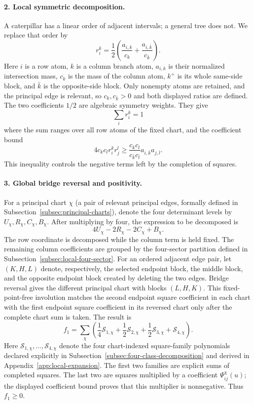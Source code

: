 \documentclass[11pt]{article}
\begin{document}
\paragraph{2. Local symmetric decomposition.}
A caterpillar has a linear order of adjacent intervals; a general tree does
not.  We replace that order by
\[
r_i^k=\frac12\left(\frac{a_{i,k}}{c_k}+\frac{a_{i,\bar k}}{c_{\bar k}}\right).
\]
Here $i$ is a row atom, $k$ is a column branch atom,
$a_{i,k}$ is their normalized intersection mass, $c_k$ is the mass of the
column atom, $k^+$ is its whole same-side block, and $\bar k$ is the
opposite-side block.  Only nonempty atoms are retained, and the principal
edge is relevant, so $c_k,c_{\bar k}>0$ and both displayed ratios are
defined.  The two coefficients $1/2$ are
algebraic symmetry weights.  They give
\[
\sum_i r_i^k=1
\]
where the sum ranges over all row atoms of the fixed chart,
and the coefficient bound
\[
4c_kc_l r_i^k r_j^l
\ge
\frac{c_kc_l}{c_{\bar k}c_{\bar l}}
a_{i,\bar k}a_{j,\bar l}.
\]
This inequality controls the negative terms left by the completion of squares.

\paragraph{3. Global bridge reversal and positivity.}
For a principal chart $\chi$ (a pair of relevant principal edges, formally
defined in Subsection~\ref{subsec:principal-charts}), denote the four
determinant levels by
$U_\chi,R_\chi,C_\chi,B_\chi$.  After multiplying by four, the expression to
be decomposed is
\[
4U_\chi-2R_\chi-2C_\chi+B_\chi.
\]
The row coordinate is decomposed while the column term is held fixed.  The
remaining column coefficients are grouped by the four-sector partition
defined in Subsection~\ref{subsec:local-four-sector}.
For an ordered adjacent edge pair, let $(K,H,L)$ denote, respectively, the
selected endpoint block, the middle block, and the opposite endpoint block
created by deleting the two edges.  Bridge reversal gives the different
principal chart with blocks $(L,H,K)$.  This fixed-point-free involution
matches the second endpoint square coefficient in each chart with the first
endpoint square coefficient in its reversed chart only after the complete
chart sum is taken.  The result is
\[
f_1=\sum_\chi\left(\frac14\mathcal S_{1,\chi}
+\frac12\mathcal S_{2,\chi}
+\frac12\mathcal S_{3,\chi}
+\mathcal S_{4,\chi}\right).
\]
Here $\mathcal S_{1,\chi},\ldots,\mathcal S_{4,\chi}$ denote the four
chart-indexed square-family polynomials declared explicitly in
Subsection~\ref{subsec:four-class-decomposition} and derived in
Appendix~\ref{app:local-expansion}.
The first two families are explicit sums of completed squares.  The last two
are squares multiplied by a coefficient $\Psi_{ij}^\chi(u)$; the displayed
coefficient bound proves that this multiplier is nonnegative.  Thus
$f_1\ge0$.
\end{document}
